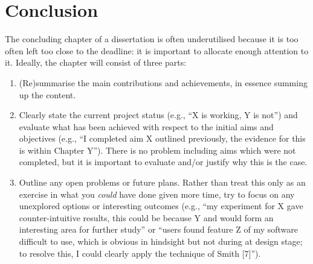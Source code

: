 \documentclass[ oneside,%
                    author={Joshua Felmeden},
                    degree={MEng},
                     title={Semantic Analysis of Financial Headlines Based on Realised Stock Returns},
                  subtitle={}]{dissertation}
\begin{document}

\chapter{Conclusion}
\label{chap:conclusion}

\noindent
The concluding chapter of a dissertation is often underutilised because it 
is too often left too close to the deadline: it is important to allocate
enough attention to it.  Ideally, the chapter will consist of three parts:

\begin{enumerate}
\item (Re)summarise the main contributions and achievements, in essence
      summing up the content.
\item Clearly state the current project status (e.g., ``X is working, Y 
      is not'') and evaluate what has been achieved with respect to the 
      initial aims and objectives (e.g., ``I completed aim X outlined 
      previously, the evidence for this is within Chapter Y'').  There 
      is no problem including aims which were not completed, but it is 
      important to evaluate and/or justify why this is the case.
\item Outline any open problems or future plans.  Rather than treat this
      only as an exercise in what you {\em could} have done given more 
      time, try to focus on any unexplored options or interesting outcomes
      (e.g., ``my experiment for X gave counter-intuitive results, this 
      could be because Y and would form an interesting area for further 
      study'' or ``users found feature Z of my software difficult to use,
      which is obvious in hindsight but not during at design stage; to 
      resolve this, I could clearly apply the technique of Smith [7]'').
\end{enumerate}


%
%
%
\end{document}
